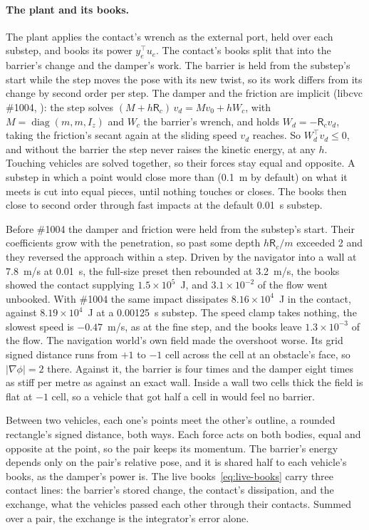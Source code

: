 \documentclass[11pt]{article}
\theoremstyle{remark}
\newcommand{\R}{\mathsf R}
\newcommand{\T}{^{\top}}
\begin{document}
\paragraph{The plant and its books.} The plant applies the contact's wrench as the external port,
held over each substep, and books its power $y_e\T u_e$. The contact's books split that into the
barrier's change and the damper's work. The barrier is held from the substep's start while the step
moves the pose with its new twist, so its work differs from its change by second order per step.
The damper and the friction are implicit (libcvc \#1004, ): the
step solves $(M+h\R_c)\,v_d=Mv_0+hW_c$, with $M=\operatorname{diag}(m,m,I_z)$ and $W_c$ the
barrier's wrench, and holds $W_d=-\R_cv_d$, taking the friction's secant again at the sliding speed
$v_d$ reaches. So $W_d\T v_d\le0$, and without the barrier the step never raises the kinetic
energy, at any $h$. Touching vehicles are solved together, so their forces stay equal and
opposite. A substep in which a point would close more than  (0.1~m by
default) on what it meets is cut into equal pieces, until nothing touches or closes. The books
then close to second order through fast impacts at the default 0.01~s substep.

Before \#1004 the damper and friction were held from the substep's start. Their coefficients grow
with the penetration, so past some depth $h\R_c/m$ exceeded 2 and they reversed the approach
within a step. Driven by the navigator into a wall at 7.8~m/s at 0.01~s, the full-size preset
then rebounded at 3.2~m/s, the books showed the contact supplying $1.5\times10^{5}$~J, and
$3.1\times10^{-2}$ of the flow went unbooked. With \#1004 the same impact dissipates
$8.16\times10^{4}$~J in the contact, against $8.19\times10^{4}$~J at a 0.00125~s substep. The
speed clamp takes nothing, the slowest speed is $-0.47$~m/s, as at the fine step, and the books
leave $1.3\times10^{-3}$ of the flow. The navigation world's own field made the overshoot worse.
Its grid signed distance runs from $+1$ to $-1$ cell across the cell at an obstacle's face, so
$\lvert\nabla\phi\rvert=2$ there. Against it, the barrier is four times and the damper eight times
as stiff per metre as against an exact wall. Inside a wall two cells thick the field is flat at
$-1$ cell, so a vehicle that got half a cell in would feel no barrier.

Between two vehicles, each one's points meet the
other's outline, a rounded rectangle's signed distance, both ways. Each force acts on both bodies,
equal and opposite at the point, so the pair keeps its momentum. The barrier's energy depends only
on the pair's relative pose, and it is shared half to each vehicle's books, as the damper's power
is. The live books~\eqref{eq:live-books} carry three contact lines: the barrier's stored change,
the contact's dissipation, and the exchange, what the vehicles passed each other through their
contacts. Summed over a pair, the exchange is the integrator's error alone.
\end{document}
